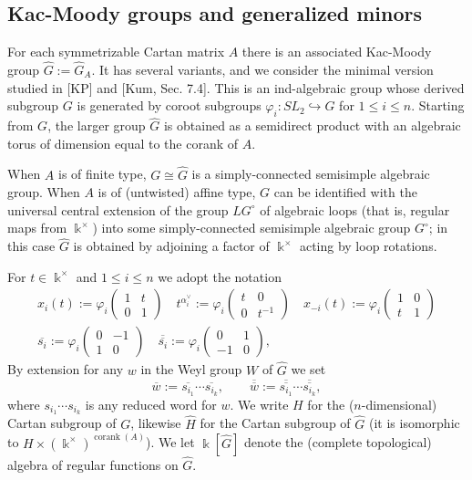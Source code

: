 \documentclass[12pt]{amsart}
\newcommand{\sayHW}[1]{\say[HW]{\color{violet}{\bf HW:}\;#1}}
\newcommand{\sayDR}[1]{\say[DR]{\color{red}{\bf DR:}\;#1}}
\newcommand{\kk}{\Bbbk}%
\newcommand\into{\hookrightarrow}
\DeclareMathOperator{\corank}{corank}
\newcommand{\ol}[1]{\overline{#1}}
\newcommand{\dol}[1]{\overline{\overline{#1}}}
\theoremstyle{remark}
\numberwithin{equation}{section}
\begin{document}
\subsection{Kac-Moody groups and generalized minors}

For each symmetrizable Cartan matrix $A$ there is an associated Kac-Moody group $\widehat{G}:=\widehat{G}_A$. 
It has several variants, and we consider the minimal version studied in [KP] and [Kum, Sec. 7.4]. 
This is an ind-algebraic group whose derived subgroup $G$ is generated by coroot subgroups $\varphi_i: SL_2 \into G$ for $1 \leq i \leq n$. Starting from $G$, the larger group $\widehat{G}$ is obtained as a semidirect product with an algebraic torus of dimension equal to the corank of $A$.


When $A$ is of finite type, $G \cong \widehat{G}$ is a simply-connected semisimple algebraic group. When $A$ is of (untwisted) affine type, $G$ can be identified with the universal central extension of the group $LG^\circ$ of algebraic loops (that is, regular maps from $\kk^\times$) into some simply-connected semisimple algebraic group $G^\circ$; in this case $\widehat{G}$ is obtained by adjoining a factor of $\kk^\times$ acting by loop rotations.


For $t \in \kk^\times$ and $1 \leq i \leq n$ we adopt the notation 
\begin{gather}
x_{i}(t):=\varphi_i\begin{pmatrix} 1 & t \\ 0 & 1\end{pmatrix} \quad  
t^{\alpha_i^\vee}:=\varphi_i\begin{pmatrix}t & 0 \\ 0 & t^{-1}\end{pmatrix} \quad
x_{-i}(t):=\varphi_i\begin{pmatrix} 1 & 0 \\ t & 1\end{pmatrix} \\
\ol{s_{i}} := \varphi_i \begin{pmatrix} 0 & -1 \\ 1 & 0 \end{pmatrix} \quad
\dol{s_{i}} := \varphi_i \begin{pmatrix} 0 & 1 \\ -1 & 0 \end{pmatrix},
\end{gather}%
By extension for any $w$ in the Weyl group $W$ of $\widehat{G}$ we set \[\ol{w} := \ol{s_{i_1}}\cdots\ol{s_{i_k}}, \quad \quad \dol{w} := \dol{s_{i_1}}\cdots\dol{s_{i_k}},\] where $s_{i_1}\cdots s_{i_k}$ is any reduced word for $w$. 
We write $H$ for the ($n$-dimensional) Cartan subgroup of $G$, likewise $\widehat{H}$ for the Cartan subgroup of $\widehat{G}$ (it is isomorphic to $H \times (\kk^\times)^{\corank(A)}$). We let $\kk[\widehat{G}]$ denote the (complete topological) algebra of regular functions on $\widehat{G}$.
\end{document}
